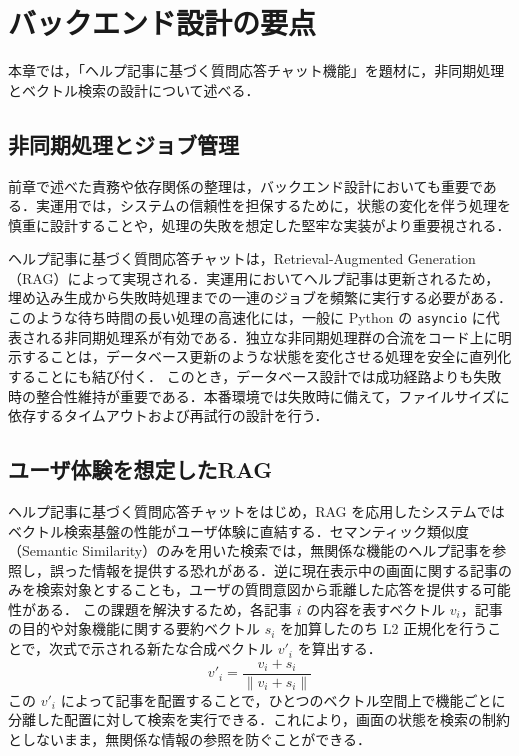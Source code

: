 \documentclass[twocolumn, 10pt]{jsarticle}
\begin{document}
\section{バックエンド設計の要点}
本章では，「ヘルプ記事に基づく質問応答チャット機能」を題材に，非同期処理とベクトル検索の設計について述べる．
\subsection{非同期処理とジョブ管理}

前章で述べた責務や依存関係の整理は，バックエンド設計においても重要である．実運用では，システムの信頼性を担保するために，状態の変化を伴う処理を慎重に設計することや，処理の失敗を想定した堅牢な実装がより重要視される．


ヘルプ記事に基づく質問応答チャットは，Retrieval-Augmented Generation（RAG）によって実現される．実運用においてヘルプ記事は更新されるため，埋め込み生成から失敗時処理までの一連のジョブを頻繁に実行する必要がある．このような待ち時間の長い処理の高速化には，一般に Python の \texttt{asyncio} に代表される非同期処理系が有効である\cite{python_asyncio}．独立な非同期処理群の合流をコード上に明示することは，データベース更新のような状態を変化させる処理を安全に直列化することにも結び付く．
このとき，データベース設計では成功経路よりも失敗時の整合性維持が重要である．本番環境では失敗時に備えて，ファイルサイズに依存するタイムアウトおよび再試行の設計を行う．

\subsection{ユーザ体験を想定したRAG}

ヘルプ記事に基づく質問応答チャットをはじめ，RAG を応用したシステムではベクトル検索基盤の性能がユーザ体験に直結する．セマンティック類似度（Semantic Similarity）のみを用いた検索では，無関係な機能のヘルプ記事を参照し，誤った情報を提供する恐れがある．逆に現在表示中の画面に関する記事のみを検索対象とすることも，ユーザの質問意図から乖離した応答を提供する可能性がある．
この課題を解決するため，各記事 $i$ の内容を表すベクトル $v_i$，記事の目的や対象機能に関する要約ベクトル $s_i$ を加算したのち L2 正規化を行うことで，次式で示される新たな合成ベクトル $v'_i$ を算出する．
\begin{equation}
    v'_i = \frac{v_i + s_i}{\|v_i + s_i\|}
    \label{eq:vector_norm}
\end{equation}
この $v'_i$ によって記事を配置することで，ひとつのベクトル空間上で機能ごとに分離した配置に対して検索を実行できる．これにより，画面の状態を検索の制約としないまま，無関係な情報の参照を防ぐことができる．
\end{document}
